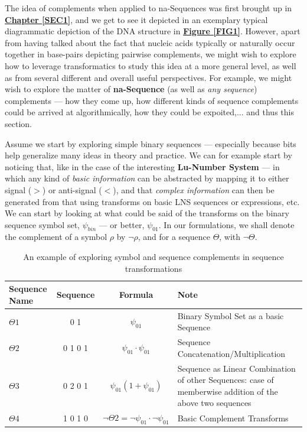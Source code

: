 \documentclass[a4paper, 18pt]{book} %
\begin{document}
The idea of complements when applied to na-Sequences was first brought up in \textbf{\hyperref[SEC1]{Chapter \ref{SEC1}}}, and we get to see it depicted in an exemplary typical diagrammatic depiction of the DNA structure in \textbf{\hyperref[FIG1]{Figure \ref{FIG1}}}. However, apart from having talked about the fact that nucleic acids typically or naturally occur together in base-pairs depicting pairwise complements, we might wish to explore how to leverage transformatics to study this idea at a more general level, as well as from several different and overall useful perspectives. For example, we might wish to explore the matter of \textbf{na-Sequence} (as well as \textit{any sequence}) complements --- how they come up, how different kinds of sequence complements could be arrived at algorithmically, how they could be expoited,... and thus this section.

Assume we start by exploring simple binary sequences --- especially because bits help generalize many ideas in theory and practice. We can for example start by noticing that, like in the case of the interesting \textbf{Lu-Number System}\cite{lnspaper} --- in which any kind of \textit{basic information} can be abstracted by mapping it to either signal ($>$) or anti-signal ($<$), and that \textit{complex information} can then be generated from that using transforms on basic LNS sequences or expressions, etc. We can start by looking at what could be said of the transforms on the binary sequence symbol set, $\psi_{bin}$ --- or better, $\psi_{01}$. In our formulations, we shall denote the complement of a symbol $\rho$ by $\lnot\rho$, and for a sequence $\Theta$, with $\lnot\Theta$.


\begin{table}[H]
  \centering
  \Large
	\begin{tabular}[t]{|p{2cm}|c|c|p{4cm}|}
	\hline
	Sequence Name & Sequence & Formula & Note\\
	\hline
	\hline
	$\Theta1$ & 0 1 & $\psi_{01}$ & Binary Symbol Set as a basic Sequence\\
	\hline
	$\Theta2$ & 0 1 0 1 & $\psi_{01}\cdot\psi_{01}$ & Sequence Concatenation/Multiplication\\
	\hline
	$\Theta3$ & 0 2 0 1 & $\psi_{01}(1 + \psi_{01})$ & Sequence as Linear Combination of other Sequences: case of memberwise addition of the above two sequences\\
	\hline
	$\Theta4$ & 1 0 1 0 & $\lnot\Theta2 = \lnot\psi_{01} \cdot \lnot\psi_{01}$ & Basic Complement Transforms\\
	\hline
	              
\end{tabular}
 \caption{An example of exploring symbol and sequence complements in sequence transformations}
  \label{TABCOMPLEMENTS}
\end{table}
\end{document}
